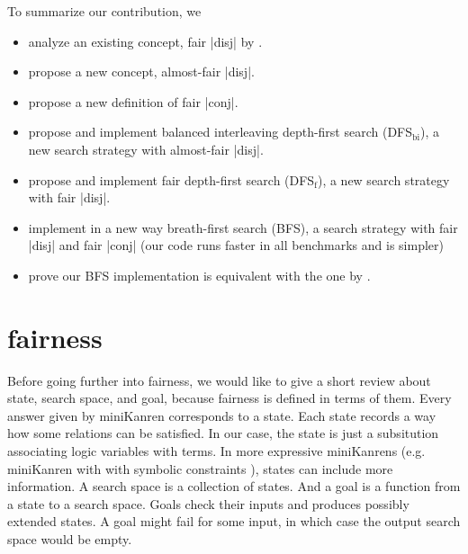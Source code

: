 \documentclass[format=acmlarge, review=true, authordraft=true]{acmart}
\begin{document}
To summarize our contribution, we
\begin{itemize}
    \item analyze an existing concept, fair \scheme|disj| by 
\citet{seres1999algebra}.
	\item propose a new concept, almost-fair \scheme|disj|.
	\item propose a new definition of fair \scheme|conj|.
	\item propose and implement balanced interleaving depth-first search 
	(DFS$_\textrm{bi}$), a new search strategy with almost-fair \scheme|disj|.
	\item propose and implement fair depth-first search (DFS$_\textrm{f}$), a 
	new search strategy with fair \scheme|disj|.
	\item implement in a new way breath-first search (BFS), a search strategy 
	with fair \scheme|disj| and fair \scheme|conj|
	(our code runs faster in all benchmarks and is simpler)
	\item prove our BFS implementation is equivalent with the one by 
	\citet{seres1999algebra}.
\end{itemize}


 

\section{fairness}

Before going further into fairness, we would like to give a short review about 
state, search space, and goal, because fairness is defined in terms of them. 
Every answer given by miniKanren corresponds to a state. Each state records a 
way how some relations can be satisfied. In our case, the state is just a 
subsitution associating logic variables with terms. In more expressive 
miniKanrens (e.g. miniKanren with with symbolic constraints 
\citep{hemann2017framework}), states can include more information. A search 
space is a collection of states. And a goal is a function from a state to a 
search space. Goals check their inputs and produces possibly extended states. A 
goal might fail for some input, in which case the output search space would be 
empty.
\end{document}
